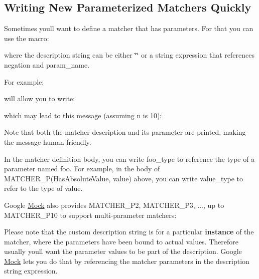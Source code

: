 \subsection*{Writing New Parameterized Matchers Quickly}

Sometimes you\textquotesingle{}ll want to define a matcher that has parameters. For that you can use the macro\+: 
\begin{DoxyCode}{0}
\end{DoxyCode}
 where the description string can be either {\ttfamily \char`\"{}\char`\"{}} or a string expression that references {\ttfamily negation} and {\ttfamily param\+\_\+name}.

For example\+: 
\begin{DoxyCode}{0}
\end{DoxyCode}
 will allow you to write\+: 
\begin{DoxyCode}{0}
\end{DoxyCode}
 which may lead to this message (assuming {\ttfamily n} is 10)\+: 
\begin{DoxyCode}{0}
\end{DoxyCode}


Note that both the matcher description and its parameter are printed, making the message human-\/friendly.

In the matcher definition body, you can write {\ttfamily foo\+\_\+type} to reference the type of a parameter named {\ttfamily foo}. For example, in the body of {\ttfamily M\+A\+T\+C\+H\+E\+R\+\_\+\+P(\+Has\+Absolute\+Value, value)} above, you can write {\ttfamily value\+\_\+type} to refer to the type of {\ttfamily value}.

Google \mbox{\hyperlink{class_mock}{Mock}} also provides {\ttfamily M\+A\+T\+C\+H\+E\+R\+\_\+\+P2}, {\ttfamily M\+A\+T\+C\+H\+E\+R\+\_\+\+P3}, ..., up to {\ttfamily M\+A\+T\+C\+H\+E\+R\+\_\+\+P10} to support multi-\/parameter matchers\+: 
\begin{DoxyCode}{0}
\end{DoxyCode}


Please note that the custom description string is for a particular {\bfseries{instance}} of the matcher, where the parameters have been bound to actual values. Therefore usually you\textquotesingle{}ll want the parameter values to be part of the description. Google \mbox{\hyperlink{class_mock}{Mock}} lets you do that by referencing the matcher parameters in the description string expression.

